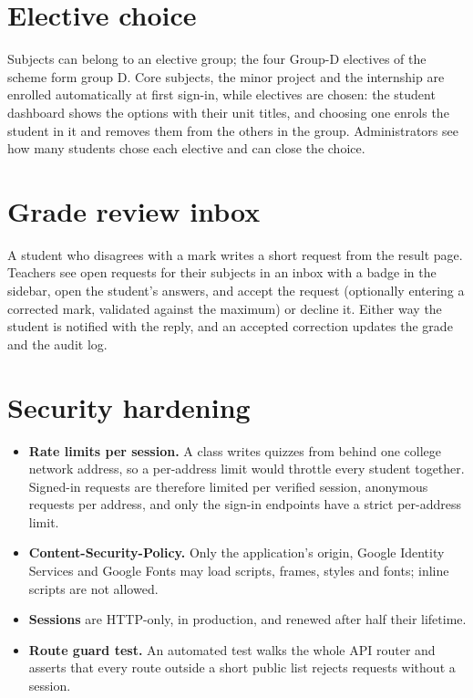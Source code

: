 \documentclass[12pt,a4paper,oneside]{report}
\newcommand{\code}[1]{\texttt{\detokenize{#1}}}
\begin{document}
\section{Elective choice}
Subjects can belong to an elective group; the four Group-D electives of the scheme form group D. Core subjects, the minor project and the internship are enrolled automatically at first sign-in, while electives are chosen: the student dashboard shows the options with their unit titles, and choosing one enrols the student in it and removes them from the others in the group. Administrators see how many students chose each elective and can close the choice.

\section{Grade review inbox}
A student who disagrees with a mark writes a short request from the result page. Teachers see open requests for their subjects in an inbox with a badge in the sidebar, open the student's answers, and accept the request (optionally entering a corrected mark, validated against the maximum) or decline it. Either way the student is notified with the reply, and an accepted correction updates the grade and the audit log.

\section{Security hardening}
\begin{itemize}
  \item \textbf{Rate limits per session.} A class writes quizzes from behind one college network address, so a per-address limit would throttle every student together. Signed-in requests are therefore limited per verified session, anonymous requests per address, and only the sign-in endpoints have a strict per-address limit.
  \item \textbf{Content-Security-Policy.} Only the application's origin, Google Identity Services and Google Fonts may load scripts, frames, styles and fonts; inline scripts are not allowed.
  \item \textbf{Sessions} are HTTP-only, \code{Secure} in production, and renewed after half their lifetime.
  \item \textbf{Route guard test.} An automated test walks the whole API router and asserts that every route outside a short public list rejects requests without a session.
\end{itemize}
\end{document}
